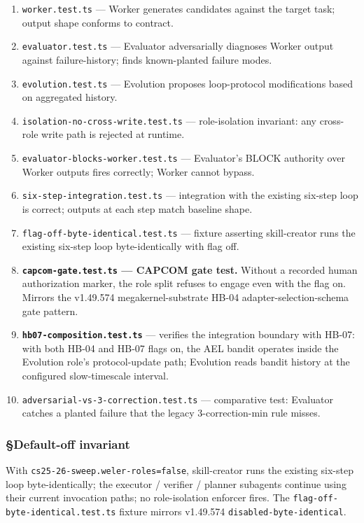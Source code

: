 \documentclass[11pt,letterpaper]{article}
\providecommand{\tightlist}{\setlength{\itemsep}{0pt}\setlength{\parskip}{0pt}}
\begin{document}
\begin{enumerate}
\def\labelenumi{\arabic{enumi}.}
\tightlist
\item
  \texttt{worker.test.ts} --- Worker generates candidates against the
  target task; output shape conforms to contract.
\item
  \texttt{evaluator.test.ts} --- Evaluator adversarially diagnoses
  Worker output against failure-history; finds known-planted failure
  modes.
\item
  \texttt{evolution.test.ts} --- Evolution proposes loop-protocol
  modifications based on aggregated history.
\item
  \texttt{isolation-no-cross-write.test.ts} --- role-isolation
  invariant: any cross-role write path is rejected at runtime.
\item
  \texttt{evaluator-blocks-worker.test.ts} --- Evaluator's BLOCK
  authority over Worker outputs fires correctly; Worker cannot bypass.
\item
  \texttt{six-step-integration.test.ts} --- integration with the
  existing six-step loop is correct; outputs at each step match baseline
  shape.
\item
  \texttt{flag-off-byte-identical.test.ts} --- fixture asserting
  skill-creator runs the existing six-step loop byte-identically with
  flag off.
\item
  \textbf{\texttt{capcom-gate.test.ts} --- CAPCOM gate test.} Without a
  recorded human authorization marker, the role split refuses to engage
  even with the flag on. Mirrors the v1.49.574 megakernel-substrate
  HB-04 adapter-selection-schema gate pattern.
\item
  \textbf{\texttt{hb07-composition.test.ts}} --- verifies the
  integration boundary with HB-07: with both HB-04 and HB-07 flags on,
  the AEL bandit operates inside the Evolution role's protocol-update
  path; Evolution reads bandit history at the configured slow-timescale
  interval.
\item
  \texttt{adversarial-vs-3-correction.test.ts} --- comparative test:
  Evaluator catches a planted failure that the legacy 3-correction-min
  rule misses.
\end{enumerate}

\subsubsection{§Default-off invariant}

With \texttt{cs25-26-sweep.weler-roles=false}, skill-creator runs the
existing six-step loop byte-identically; the executor / verifier /
planner subagents continue using their current invocation paths; no
role-isolation enforcer fires. The
\texttt{flag-off-byte-identical.test.ts} fixture mirrors v1.49.574
\texttt{disabled-byte-identical}.
\end{document}
